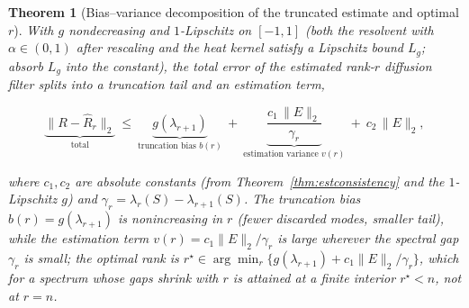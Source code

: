 \documentclass[aps,prresearch,reprint,amsmath,amssymb,nofootinbib,superscriptaddress,floatfix]{revtex4-2}
\newtheorem{theorem}{Theorem}
\theoremstyle{definition}
\theoremstyle{remark}
\theoremstyle{plain}
\begin{document}
\begin{theorem}[Bias--variance decomposition of the truncated estimate and optimal $r$]
\label{thm:truncest}
With $g$ nondecreasing and $1$-Lipschitz on $[-1,1]$ (both the resolvent with $\alpha\in(0,1)$ after rescaling
and the heat kernel satisfy a Lipschitz bound $L_g$; absorb $L_g$ into the constant), the total error of the
estimated rank-$r$ diffusion filter splits into a truncation tail and an estimation term,
\begin{widetext}
\begin{equation}
\underbrace{\big\|R-\widehat R_r\big\|_2}_{\text{total}}
\ \le\ \underbrace{g(\lambda_{r+1})}_{\text{truncation bias }b(r)}
\ +\ \underbrace{\frac{c_1\,\|E\|_2}{\gamma_r}}_{\text{estimation variance }v(r)}
\ +\ c_2\,\|E\|_2 ,
\label{eq:truncest}
\end{equation}
\end{widetext}
where $c_1,c_2$ are absolute constants (from Theorem~\ref{thm:estconsistency} and the $1$-Lipschitz $g$) and
$\gamma_r=\lambda_r(S)-\lambda_{r+1}(S)$. The truncation bias $b(r)=g(\lambda_{r+1})$ is nonincreasing in
$r$ (fewer discarded modes, smaller tail), while the estimation term $v(r)=c_1\|E\|_2/\gamma_r$ is large
wherever the spectral gap $\gamma_r$ is small; the optimal rank is
$r^\star\in\arg\min_r\{g(\lambda_{r+1})+c_1\|E\|_2/\gamma_r\}$, which for a spectrum whose gaps shrink with
$r$ is attained at a finite interior $r^\star<n$, not at $r=n$.
\end{theorem}
\end{document}
